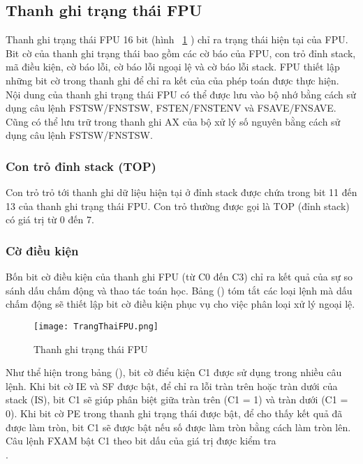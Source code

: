 		\subsection*{ Thanh ghi trạng thái FPU}
	Thanh ghi trạng thái FPU 16 bit (hình ~\ref{fig:TrangThaiFPU} ) chỉ ra trạng thái hiện tại của FPU. Bit cờ của thanh ghi trạng thái bao gồm các cờ báo của FPU, con trỏ đỉnh stack, mã điều kiện, cờ báo lỗi, cờ báo lỗi ngoại lệ và cờ báo lỗi stack. FPU thiết lập những bit cờ trong thanh ghi để chỉ ra kết của của phép toán được thực hiện.\\

	Nội dung của thanh ghi trạng thái FPU có thể được lưu vào bộ nhớ bằng cách sử dụng câu lệnh FSTSW/FNSTSW, FSTEN/FNSTENV và FSAVE/FNSAVE. Cũng có thể lưu trữ trong thanh ghi AX của bộ xử lý số nguyên bằng cách sử dụng câu lệnh FSTSW/FNSTSW.\\

		\subsubsection*{Con trỏ đỉnh stack (TOP)}
	Con trỏ trỏ tới thanh ghi dữ liệu hiện tại ở đỉnh stack được chứa trong bit 11 đến 13 của thanh ghi trạng thái FPU. Con trỏ thường được gọi là TOP (đỉnh stack) có giá trị từ 0 đến 7.

		\subsubsection*{ Cờ điều kiện}
	Bốn bit cờ điều kiện của thanh ghi FPU (từ C0 đến C3) chỉ ra kết quả của sự so sánh dấu chấm động và thao tác toán học. Bảng () tóm tắt các loại lệnh mà dấu chấm động sẽ thiết lập bit cờ điều kiện phục vụ cho việc phân loại xử lý ngoại lệ.
	
		\begin{center}
			\begin{figure}[htp]
				\begin{center}
					\texttt{[image: TrangThaiFPU.png]}
				\end{center}
				\caption{Thanh ghi trạng thái FPU}				
				\label{fig:TrangThaiFPU}				
			\end{figure}
		\end{center}	
		
		Như thể hiện trong bảng (), bit cờ điểu kiện C1 được sử dụng trong nhiều câu lệnh. Khi bit cờ IE và SF được bật, để chỉ ra lỗi tràn trên hoặc tràn dưới của stack (IS), bit C1 sẽ giúp phân biệt giữa tràn trên (C1 = 1) và tràn dưới (C1 = 0). Khi bit cờ PE trong thanh ghi trạng thái được bật, để cho thấy kết quả đã được làm tròn, bit C1 sẽ được bật nếu số được làm tròn bằng cách làm tròn lên. Câu lệnh FXAM bật C1 theo bit dấu của giá trị được kiểm tra\\.

